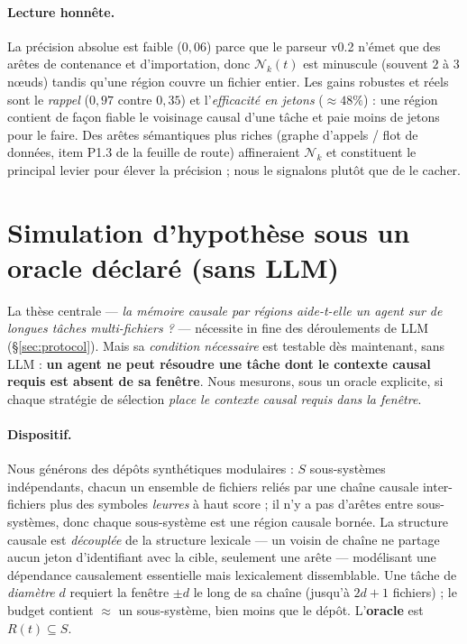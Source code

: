 \documentclass[11pt]{article}
\newcommand{\Nk}{\mathcal{N}_k}
\begin{document}
\paragraph{Lecture honnête.} La précision absolue est faible ($0{,}06$) parce que le
parseur v0.2 n'émet que des arêtes de contenance et d'importation, donc $\Nk(t)$ est
minuscule (souvent $2$ à $3$ nœuds) tandis qu'une région couvre un fichier entier. Les
gains robustes et réels sont le \emph{rappel} ($0{,}97$ contre $0{,}35$) et
l'\emph{efficacité en jetons} ($\approx\!48\%$) : une région contient de façon fiable
le voisinage causal d'une tâche et paie moins de jetons pour le faire. Des arêtes
sémantiques plus riches (graphe d'appels / flot de données, item P1.3 de la feuille de
route) affineraient $\Nk$ et constituent le principal levier pour élever la précision ;
nous le signalons plutôt que de le cacher.

\section{Simulation d'hypothèse sous un oracle déclaré (sans LLM)}\label{sec:sim}

La thèse centrale --- \emph{la mémoire causale par régions aide-t-elle un agent sur de
longues tâches multi-fichiers ?} --- nécessite in fine des déroulements de LLM
(\S\ref{sec:protocol}). Mais sa \emph{condition nécessaire} est testable dès
maintenant, sans LLM : \textbf{un agent ne peut résoudre une tâche dont le contexte
causal requis est absent de sa fenêtre}. Nous mesurons, sous un oracle explicite, si
chaque stratégie de sélection \emph{place le contexte causal requis dans la fenêtre}.

\paragraph{Dispositif.} Nous générons des dépôts synthétiques modulaires : $S$
sous-systèmes indépendants, chacun un ensemble de fichiers reliés par une chaîne
causale inter-fichiers plus des symboles \emph{leurres} à haut score ; il n'y a pas
d'arêtes entre sous-systèmes, donc chaque sous-système est une région causale bornée.
La structure causale est \emph{découplée} de la structure lexicale --- un voisin de
chaîne ne partage aucun jeton d'identifiant avec la cible, seulement une arête ---
modélisant une dépendance causalement essentielle mais lexicalement dissemblable. Une
tâche de \emph{diamètre} $d$ requiert la fenêtre $\pm d$ le long de sa chaîne (jusqu'à
$2d{+}1$ fichiers) ; le budget contient $\approx$ un sous-système, bien moins que le
dépôt. L'\textbf{oracle} est $R(t)\subseteq S$.
\end{document}
